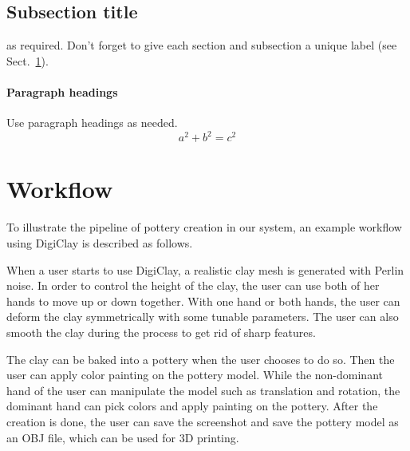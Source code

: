 \subsection{Subsection title}
\label{sec:2}
as required. Don't forget to give each section
and subsection a unique label (see Sect.~\ref{sec:1}).
\paragraph{Paragraph headings} Use paragraph headings as needed.
\begin{equation}
a^2+b^2=c^2
\end{equation}










\section{Workflow}
\label{sec:1}











To illustrate the pipeline of pottery creation in our system, an example workflow using DigiClay is described as follows.

When a user starts to use DigiClay, a realistic clay mesh is generated with Perlin noise. In order to control the height of the clay, the user can use both of her hands to move up or down together. With one hand or both hands, the user can deform the clay symmetrically with some tunable parameters. The user can also smooth the clay during the process to get rid of sharp features.

The clay can be baked into a pottery when the user chooses to do so. Then the user can apply color painting on the pottery model. While the non-dominant hand of the user can manipulate the model such as translation and rotation, the dominant hand can pick colors and apply painting on the pottery. After the creation is done, the user can save the screenshot and save the pottery model as an OBJ file, which can be used for 3D printing.












